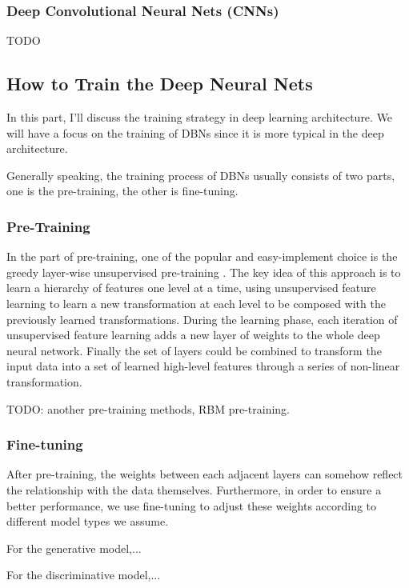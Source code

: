 \documentclass[conference]{IEEEtran}
\begin{document}
\subsubsection{Deep Convolutional Neural Nets (CNNs)}

TODO

\subsection{How to Train the Deep Neural Nets}

In this part, I'll discuss the training strategy in deep learning architecture. We will have a focus on the training of DBNs since it is more typical in the deep architecture.

Generally speaking, the training process of DBNs usually consists of two parts, one is the pre-training, the other is fine-tuning.

\subsubsection{Pre-Training}

In the part of pre-training, one of the popular and easy-implement choice is the greedy layer-wise unsupervised pre-training \cite{greedy}. The key idea of this approach is to learn a hierarchy of features one level at a time, using unsupervised feature learning to learn a new transformation at each level to be composed with the previously learned transformations. During the learning phase, each iteration of unsupervised feature learning adds a new layer of weights to the whole deep neural network. Finally the set of layers could be combined to transform the input data into a set of learned high-level features through a series of non-linear transformation.

TODO: another pre-training methods, RBM pre-training.

\subsubsection{Fine-tuning}

After pre-training, the weights between each adjacent layers can somehow reflect the relationship with the data themselves. Furthermore, in order to ensure a better performance, we use fine-tuning to adjust these weights according to different model types we assume.

For the generative model,...

For the discriminative model,...
\end{document}
